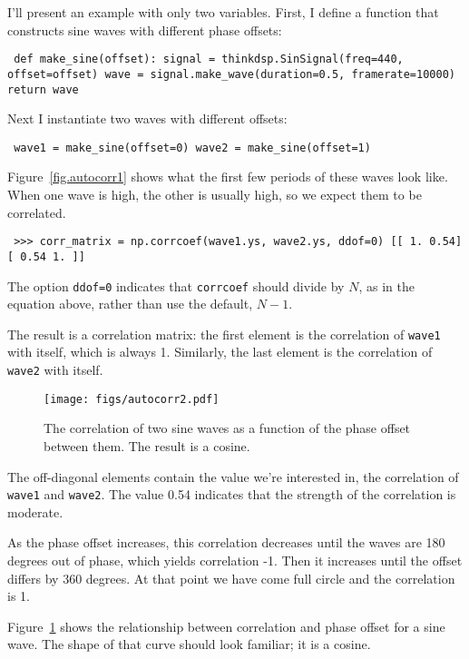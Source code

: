 \documentclass[12pt]{book} \usepackage[width=5.5in,height=8.5in, hmarginratio=3:2,vmarginratio=1:1]{geometry}
\begin{document}
I'll present an example with only two variables. First, I define a function that constructs sine waves with different phase offsets: 

\begin{verbatim} def make_sine(offset): signal = thinkdsp.SinSignal(freq=440, offset=offset) wave = signal.make_wave(duration=0.5, framerate=10000) return wave \end{verbatim} 

Next I instantiate two waves with different offsets: 

\begin{verbatim} wave1 = make_sine(offset=0) wave2 = make_sine(offset=1) \end{verbatim} 

Figure~\ref{fig.autocorr1} shows what the first few periods of these waves look like. When one wave is high, the other is usually high, so we expect them to be correlated. 

\begin{verbatim} >>> corr_matrix = np.corrcoef(wave1.ys, wave2.ys, ddof=0) [[ 1. 0.54] [ 0.54 1. ]] \end{verbatim} 

The option {\tt ddof=0} indicates that {\tt corrcoef} should divide by $N$, as in the equation above, rather than use the default, $N-1$. 

The result is a correlation matrix: the first element is the correlation of {\tt wave1} with itself, which is always 1. Similarly, the last element is the correlation of {\tt wave2} with itself. 

\begin{figure} 

\centerline{\texttt{[image: figs/autocorr2.pdf]}} \caption{The correlation of two sine waves as a function of the phase offset between them. The result is a cosine.} \label{fig.autocorr2} \end{figure} 

The off-diagonal elements contain the value we're interested in, the correlation of {\tt wave1} and {\tt wave2}. The value 0.54 indicates that the strength of the correlation is moderate. 

As the phase offset increases, this correlation decreases until the waves are 180 degrees out of phase, which yields correlation -1. Then it increases until the offset differs by 360 degrees. At that point we have come full circle and the correlation is 1. 

Figure~\ref{fig.autocorr2} shows the relationship between correlation and phase offset for a sine wave. The shape of that curve should look familiar; it is a cosine. 
\end{document}
